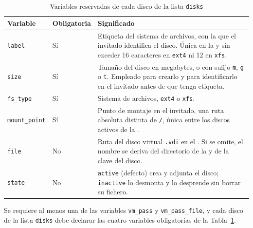 \begin{table}[H]
    \centering
    \caption{Variables reservadas de cada disco de la lista \texttt{disks}}
    \label{tab:claves-disco}
    \begin{tabular}{@{}llp{8.4cm}@{}}
        \toprule
        \textbf{Variable} & \textbf{Obligatoria} & \textbf{Significado} \\
        \midrule
        \texttt{label} & Sí & Etiqueta del sistema de archivos, con la que el invitado identifica el disco. Única en la \vm{} y sin exceder 16 caracteres en \texttt{ext4} ni 12 en \texttt{xfs}. \\
        \texttt{size} & Sí & Tamaño del disco en megabytes, o con sufijo \texttt{m}, \texttt{g} o \texttt{t}. Empleado para crearlo y para identificarlo en el invitado antes de que tenga etiqueta. \\
        \texttt{fs\_type} & Sí & Sistema de archivos, \texttt{ext4} o \texttt{xfs}. \\
        \texttt{mount\_point} & Sí & Punto de montaje en el invitado, una ruta absoluta distinta de \texttt{/}, única entre los discos activos de la \vm{}. \\
        \texttt{file} & No & Ruta del disco virtual \texttt{.vdi} en el \host{}. Si se omite, el nombre se deriva del directorio de la \vm{} y de la clave del disco. \\
        \texttt{state} & No & \texttt{active} (defecto) crea y adjunta el disco; \texttt{inactive} lo desmonta y lo desprende sin borrar su fichero. \\
        \bottomrule
    \end{tabular}
\end{table}

\noindent Se requiere al menos una de las variables \texttt{vm\_pass} y \texttt{vm\_pass\_file}, y cada disco de la lista \texttt{disks} debe declarar las cuatro variables obligatorias de la Tabla~\ref{tab:claves-disco}.

